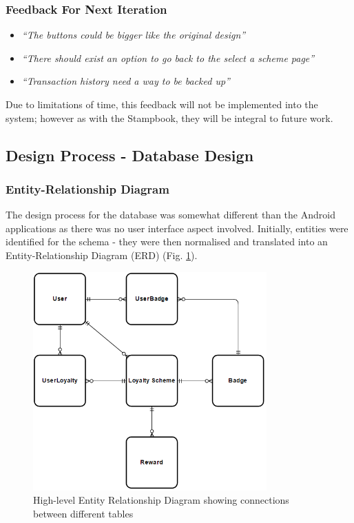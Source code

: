 \subsubsection{Feedback For Next Iteration}
\begin{itemize}
  \item \textit{``The buttons could be bigger like the original design''}
  \item \textit{``There should exist an option to go back to the select a scheme page''}
  \item \textit{``Transaction history need a way to be backed up''}
\end{itemize}

Due to limitations of time, this feedback will not be implemented into the system; however as with the Stampbook, they will be integral to future work. 


\newpage
\subsection{Design Process - Database Design}
\subsubsection{Entity-Relationship Diagram}
The design process for the database was somewhat different than the Android applications as there was no user interface aspect involved. Initially, entities were identified for the schema - they were then normalised and translated into an Entity-Relationship Diagram (ERD) (Fig. \ref{fig:erd}).

\begin{figure}[H]
  \centering
    \includegraphics[width=0.8\textwidth]{img/erd.png}
      \caption{High-level Entity Relationship Diagram showing connections between different tables}
      \label{fig:erd}
\end{figure}


